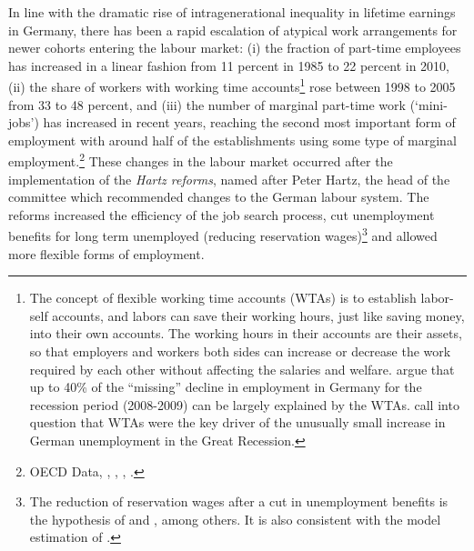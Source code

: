 \documentclass[12pt, a4paper]{article}
\begin{document}
In line with the dramatic rise of intragenerational inequality in lifetime earnings in Germany, there has been a rapid escalation of atypical work arrangements for newer cohorts entering the labour market: (i) the fraction of part-time employees has increased in a linear fashion from 11 percent in 1985 to 22 percent in 2010, (ii) the share of workers with working time accounts\footnote{The concept of flexible working time accounts (WTAs) is to establish labor-self accounts, and labors can save their working hours, just like saving money, into their own accounts. The working hours in their accounts are their assets, so that employers and workers both sides can increase or decrease the work required by each other without affecting the salaries and welfare. \cite{BurdaHunt11} argue that up to 40\% of the “missing” decline in employment in Germany for the recession period (2008-2009) can be largely explained by the WTAs. \cite{BalleerGehrkeMerkl2017} call into question that WTAs were the key driver of the unusually small increase in German unemployment in the Great Recession.} rose between 1998 to 2005 from 33 to 48 percent, and (iii) the number of marginal part-time work (`mini-jobs') has increased in recent years, reaching the second most important form of employment with around half of the establishments using some type of marginal employment.\footnote{OECD Data, \cite{Gro2006}, \cite{Bechmann10}, \cite{CarriTuRo15}, \cite{Galasi17}.} These changes in the labour market occurred after the implementation of the \emph{Hartz reforms}, named after Peter Hartz, the head of the committee which recommended changes to the German labour system. The reforms increased the efficiency of the job search process, cut unemployment benefits for long term unemployed (reducing reservation wages)\footnote{The reduction of reservation wages after a cut in unemployment benefits is the hypothesis of \cite{BurdaHunt11} and \cite{LiSchWie16}, among others. It is also consistent with the model estimation of \cite{Price16}.} and allowed more flexible forms of employment.

\end{document}
